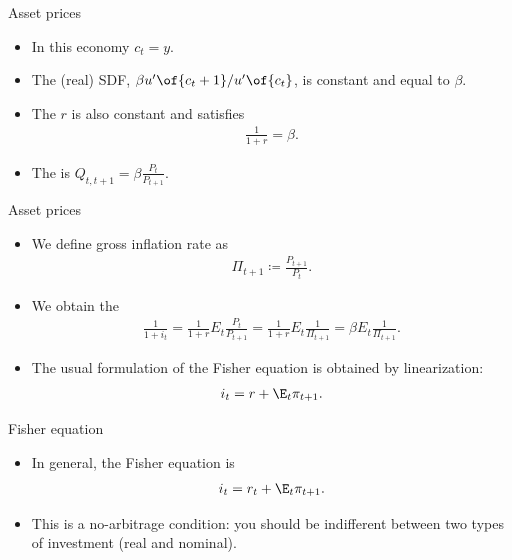 \documentclass[11pt,xcolor={dvipsnames},aspectratio=159,hyperref={pdftex,pdfpagemode=UseNone,hidelinks,pdfdisplaydoctitle=true},usepdftitle=false]{beamer}
\begin{document}
\begin{frame}{Asset prices}
\begin{itemize}
        \item In this economy $c_t = y$.
        \item The (real) SDF, $\beta u'\of{c_t+1}\slash u'\of{c_t}$, is constant and equal to $\beta$.
        \item The   $r$ is also constant and satisfies \begin{align*}
            \frac{1}{1+r} = \beta.
        \end{align*}
        \item The  is $Q_{t,t+1} = \beta \frac{P_t}{P_{t+1}}$. 
    \end{itemize}
\end{frame}

\begin{frame}{Asset prices}
\begin{itemize}
        \item We define gross inflation rate as 
         \begin{align*}
            \Pi_{t+1} \coloneq \frac{P_{t+1}}{P_t}.
        \end{align*}
        \item We obtain the 
        \begin{align*}
            \frac{1}{1+i_t} = \frac{1}{1+r} E_t \frac{P_{t}}{P_{t+1}} = \frac{1}{1+r} E_t\frac{1}{\Pi_{t+1}} = \beta  E_t\frac{1}{\Pi_{t+1}} .
         \end{align*}
        \item The usual formulation of the Fisher equation is obtained by linearization: 
        \begin{align*}
                i_t = r + \E_t \pi_{t+1}.
        \end{align*}
    \end{itemize}
\end{frame}


\begin{frame}{Fisher equation}
    \begin{itemize}
        
            \item In general, the Fisher equation is \begin{align*}
                i_t = r_t + \E_t \pi_{t+1}.
            \end{align*}
            \item This is a no-arbitrage condition: you should be indifferent between two types of investment (real and nominal).
        \end{itemize}
    \end{frame}
\end{document}
